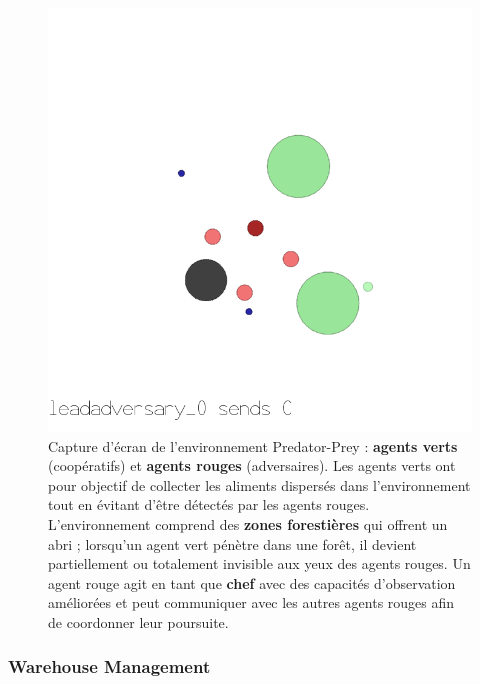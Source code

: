 \begin{figure}[h!]
  \centering
  \includegraphics[trim=0cm 4.5cm 0cm 1cm, clip,width=0.9\linewidth]{figures/predator_prey.png}
  \caption[Capture d'écran de l'environnement Predator-Prey]{Capture d'écran de l'environnement Predator-Prey : \textbf{agents verts} (coopératifs) et \textbf{agents rouges} (adversaires). Les agents verts ont pour objectif de collecter les aliments dispersés dans l'environnement tout en évitant d'être détectés par les agents rouges. L'environnement comprend des \textbf{zones forestières} qui offrent un abri ; lorsqu'un agent vert pénètre dans une forêt, il devient partiellement ou totalement invisible aux yeux des agents rouges. Un agent rouge agit en tant que \textbf{chef} avec des capacités d'observation améliorées et peut communiquer avec les autres agents rouges afin de coordonner leur poursuite.}
  \label{fig:predator_prey}
\end{figure}

\subsubsection*{Warehouse Management}


